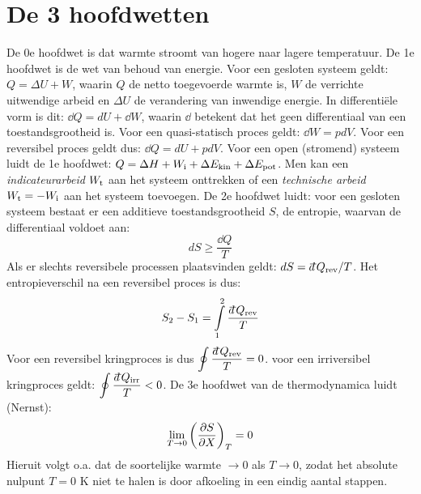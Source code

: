 \documentclass[twoside]{report}
\begin{document}
\section{De 3 hoofdwetten}
De 0e hoofdwet is dat warmte stroomt van hogere naar lagere temperatuur.
De 1e hoofdwet is de wet van behoud van energie. Voor een gesloten systeem
geldt: $Q=\Delta U+W$, waarin $Q$ de netto toegevoerde warmte is, $W$ de
verrichte uitwendige arbeid en $\Delta U$ de verandering van inwendige
energie. In differenti\"ele vorm is dit: $\dd Q=dU+\dd W$, waarin $\dd$
betekent dat het geen differentiaal van een toestandsgrootheid is. Voor een
quasi-statisch proces geldt: $\dd W=pdV$. Voor een reversibel proces geldt
dus: $\dd Q=dU+pdV$.
\npar
Voor een open (stromend) systeem luidt de 1e hoofdwet:
$Q=\Delta H+W_{\rm i}+\Delta E_{\rm kin}+\Delta E_{\rm pot}$. Men kan een
{\it indicateurarbeid} $W_{\rm t}$ aan het systeem onttrekken of een
{\it technische arbeid} $W_{\rm t}=-W_{\rm i}$ aan het systeem toevoegen.
\npar
De 2e hoofdwet luidt: voor een gesloten systeem bestaat er een additieve
toestandsgrootheid $S$, de entropie, waarvan de differentiaal voldoet aan:
\[
dS\geq\frac{\dd Q}{T}
\]
Als er slechts reversibele processen plaatsvinden geldt:
$dS=\dd Q_{\rm rev}/T$. Het entropieverschil na een reversibel proces is dus:
\[
S_2-S_1=\int\limits_1^2 \frac{\dd Q_{\rm rev}}{T}
\]
Voor een reversibel kringproces is dus $\displaystyle\oint\frac{\dd Q_{\rm rev}}{T}=0$.
\npar
voor een irriversibel kringproces geldt: $\displaystyle\oint\frac{\dd Q_{\rm irr}}{T}<0$.
\npar
De 3e hoofdwet van de thermodynamica luidt (Nernst):
\[
\lim_{T\rightarrow0}\left(\frac{\partial S}{\partial X}\right)_{T}=0
\]
Hieruit volgt o.a. dat de soortelijke warmte $\rightarrow0$ als
$T\rightarrow0$, zodat het absolute nulpunt $T=0$ K niet te halen is door
afkoeling in een eindig aantal stappen.
\end{document}
